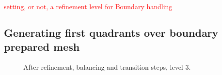 \documentclass[10pt]{article}
\begin{document}
\textcolor{red}{setting, or not, a refinement level for Boundary handling}

\subsection{Generating first quadrants over boundary prepared mesh}


\begin{figure}[htb]
\centering
 \caption{After refinement, balancing and transition steps, level 3.}
\label{fig:generate3}
\end{figure}
\end{document}
